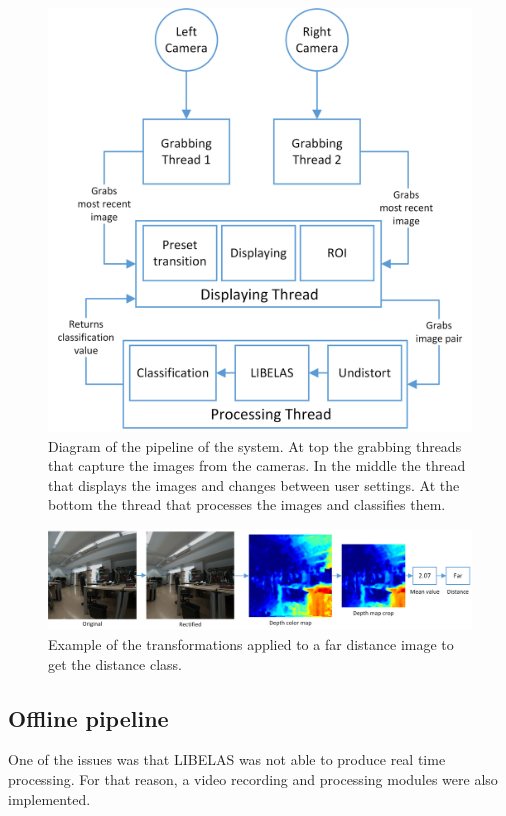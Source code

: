 \documentclass[10pt,a4paper,twocolumn,twoside]{article}
\begin{document}
	\begin{figure}
		\centering
		\includegraphics[width=1\linewidth]{img/pipeline.png}
		\caption{Diagram of the pipeline of the system. At top the grabbing threads that capture the images from the cameras. In the middle the thread that displays the images and changes between user settings. At the bottom the thread that processes the images and classifies them. }
		\label{fig:pipeline}
	\end{figure}
	
	\begin{figure}
		\centering
		\includegraphics[width=1\linewidth]{img/pipelineFarSimple.png}
		\caption{Example of the transformations applied to a far distance image to get the distance class.}
		\label{fig:pipelinephotos}
	\end{figure}
	
	\subsection{Offline pipeline}
	One of the issues was that LIBELAS was not able to produce real time processing. For that reason, a video recording and processing modules were also implemented.  
	
\end{document}
